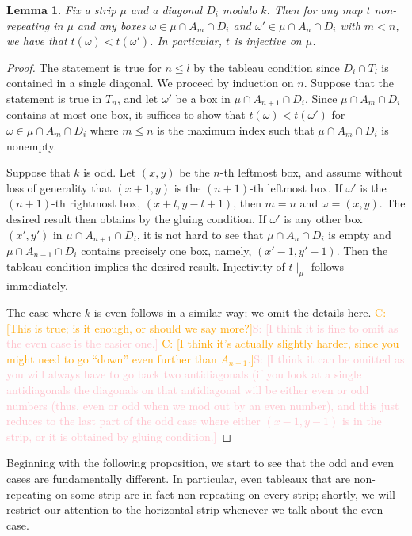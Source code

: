 \documentclass[11pt,reqno]{amsart}
\newcommand*{\restrict}[1]{{\mid}_{#1}}
\newcommand{\caelan}[1]{\textcolor{orange}{\sf C: [#1]}}
\newcommand{\steven}[1]{\textcolor{pink}{\sf S: [#1]}}
\theoremstyle{definition}
\theoremstyle{problem}
\theoremstyle{plain}
\newtheorem{lemma}[definition]{Lemma}
\theoremstyle{remark}
\theoremstyle{theorem}
\numberwithin{equation}{section}
\numberwithin{figure}{section}
\begin{document}
\begin{lemma}\label{lem:19}
  Fix a strip $\mu$ and a diagonal $D_i$ modulo $k$.  Then for any map
  $t$ non-repeating in $\mu$ and any boxes
  $\omega \in \mu \cap A_m \cap D_i$ and
  $\omega' \in \mu \cap A_n \cap D_i$ with $m < n$, we have that
  $t(\omega) < t(\omega')$.  In particular, $t$ is injective on $\mu$.
\end{lemma}
\begin{proof}
  The statement is true for $n \leq l$ by the tableau condition since
  $D_i \cap T_l$ is contained in a single diagonal.  We proceed by
  induction on $n$.  Suppose that the statement is true in $T_n$, and
  let $\omega'$ be a box in $\mu \cap A_{n+1} \cap D_i$.  Since
  $\mu \cap A_m \cap D_i$ contains at most one box, it suffices to
  show that $t(\omega) < t(\omega')$ for
  $\omega \in \mu \cap A_m \cap D_i$ where $m \leq n$ is the maximum
  index such that $\mu \cap A_m \cap D_i$ is nonempty.

  Suppose that $k$ is odd.  Let $(x,y)$ be the $n$-th leftmost box,
  and assume without loss of generality that $(x+1,y)$ is the
  $(n+1)$-th leftmost box.  If $\omega'$ is the $(n+1)$-th rightmost
  box, $(x+l,y-l+1)$, then $m = n$ and $\omega = (x,y)$.  The desired
  result then obtains by the gluing condition.  If $\omega'$ is any
  other box $(x',y')$ in $\mu \cap A_{n+1} \cap D_i$, it is not hard
  to see that $\mu \cap A_n \cap D_i$ is empty and
  $\mu \cap A_{n-1} \cap D_i$ contains precisely one box, namely,
  $(x'-1,y'-1)$.  Then the tableau condition implies the desired
  result.  Injectivity of $t\restrict{\mu}$ follows immediately.

  The case where $k$ is even follows in a similar way; we omit the
  details here.  \caelan{This is true; is it enough, or should we say
    more?}\steven{I think it is fine to omit as the even case is the
    easier one.}  \caelan{I think it's actually slightly harder, since
    you might need to go ``down'' even further than $A_{n-1}$.}\steven{I think it can be omitted as you will always have to go back two antidiagonals (if you look at a single antidiagonals the diagonals on that antidiagonal will be either even or odd numbers (thus, even or odd when we mod out by an even number), and this just reduces to the last part of the odd case where either $(x-1,y-1)$ is in the strip, or it is obtained by gluing condition.}
\end{proof}

Beginning with the following proposition, we start to see that the odd
and even cases are fundamentally different.  In particular, even
tableaux that are non-repeating on some strip are in fact
non-repeating on every strip; shortly, we will restrict our attention
to the horizontal strip whenever we talk about the even case.
\end{document}
